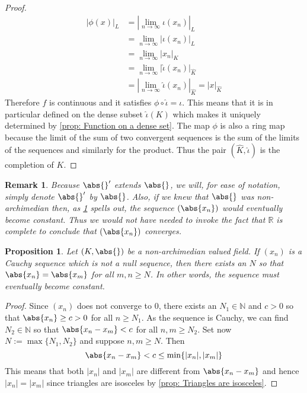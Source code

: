 \documentclass{article}
\newtheorem{proposition}{Proposition}[section]
\newtheorem{remark}{Remark}[section]
\newcommand{\mbb}[1]{\mathbb{#1}}
\begin{document}
\begin{proof}
    \begin{align*}
        |\phi(x)|_{L} &= |\lim_{n \to \infty} \iota(x_n)|_{L} \\
        &= \lim_{n \to \infty} |\iota(x_n)|_{L} \\ 
        &= \lim_{n \to \infty} |x_n|_{K} \\
        &= \lim_{n \to \infty} |\hat \iota(x_n)|_{\hat K} \\
        &= |\lim_{n \to \infty} \hat \iota(x_n)|_{\hat K} = |x|_{\hat K}
    \end{align*}
    Therefore $f$ is continuous and it satisfies $\phi \circ \hat \iota = \iota$. This means that it is in particular defined on the dense subset $\hat \iota(K)$ which makes it uniquely determined by \cref{prop: Function on a dense set}. The map $\phi$ is also a ring map because the limit of the sum of two convergent sequences is the sum of the limits of the sequences and similarly for the product. Thus the pair $(\hat K, \hat \iota)$ is the completion of $K$. 
\end{proof}
\begin{remark}
    Because $\abs{}'$ extends $\abs{}$, we will, for ease of notation, simply denote $\abs{}'$ by $\abs{}$. Also, if we knew that $\abs{}$ was non-archimedian then, as \cref{prop: Non-archimedian absolute value has constant tail} spells out, the sequence $(\abs{x_n})$ would eventually become constant. Thus we would not have needed to invoke the fact that $\mbb R$ is complete to conclude that $(\abs{x_n})$ converges.
\end{remark}



 


\begin{proposition}\label{prop: Non-archimedian absolute value has constant tail}
    Let $(K, \abs{})$ be a non-archimedian valued field. If $(x_n)$ is a Cauchy sequence which is not a null sequence, then there exists an $N$ so that $\abs{x_n} = \abs{x_m}$ for all $m,n \geq N$. In other words, the sequence must eventually become constant.
\end{proposition}
\begin{proof}
    Since $(x_n)$ does not converge to 0, there exists an $N_1 \in \mbb N$ and $c > 0$ so that $\abs{x_n} \geq c > 0$ for all $n \geq N_1$. As the sequence is Cauchy, we can find $N_2 \in \mbb N$ so that $\abs{x_n - x_m} < c$ for all $n,m \geq N_2$. Set now $N := \max \{N_1, N_2\}$ and suppose $n,m \geq N$. Then 
    $$\abs{x_n - x_m} <  c \leq \min\{|x_n|, |x_m|\}$$
    This means that both $|x_n|$ and $|x_m|$ are different from $\abs{x_n - x_m}$ and hence $|x_n| = |x_m|$ since triangles are isosceles by \cref{prop: Triangles are isosceles}. 
\end{proof}
\end{document}
